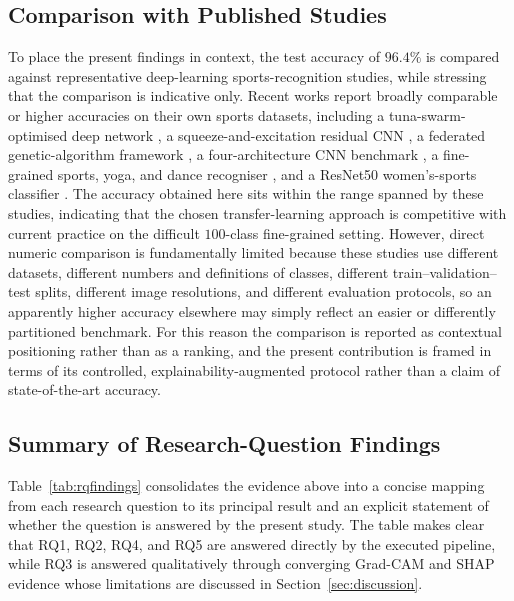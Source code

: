 \subsection{Comparison with Published Studies}
\label{subsec:res-litcompare}

To place the present findings in context, the \bestModel{} test accuracy of $96.4\%$ is compared against representative deep-learning sports-recognition studies, while stressing that the comparison is indicative only.
Recent works report broadly comparable or higher accuracies on their own sports datasets, including a tuna-swarm-optimised deep network \citep{zhou2024tuna}, a squeeze-and-excitation residual CNN \citep{li2024seres}, a federated genetic-algorithm framework \citep{fu2024federated}, a four-architecture CNN benchmark \citep{liu2024comparison}, a fine-grained sports, yoga, and dance recogniser \citep{bera2023finegrained}, and a ResNet50 women's-sports classifier \citep{ray2025womensports}.
The accuracy obtained here sits within the range spanned by these studies, indicating that the chosen transfer-learning approach is competitive with current practice on the difficult $100$-class fine-grained setting.
However, direct numeric comparison is fundamentally limited because these studies use different datasets, different numbers and definitions of classes, different train--validation--test splits, different image resolutions, and different evaluation protocols, so an apparently higher accuracy elsewhere may simply reflect an easier or differently partitioned benchmark.
For this reason the comparison is reported as contextual positioning rather than as a ranking, and the present contribution is framed in terms of its controlled, explainability-augmented protocol rather than a claim of state-of-the-art accuracy.

\subsection{Summary of Research-Question Findings}
\label{subsec:res-rqsummary}

Table~\ref{tab:rqfindings} consolidates the evidence above into a concise mapping from each research question to its principal result and an explicit statement of whether the question is answered by the present study.
The table makes clear that RQ1, RQ2, RQ4, and RQ5 are answered directly by the executed pipeline, while RQ3 is answered qualitatively through converging Grad-CAM and SHAP evidence whose limitations are discussed in Section~\ref{sec:discussion}.

